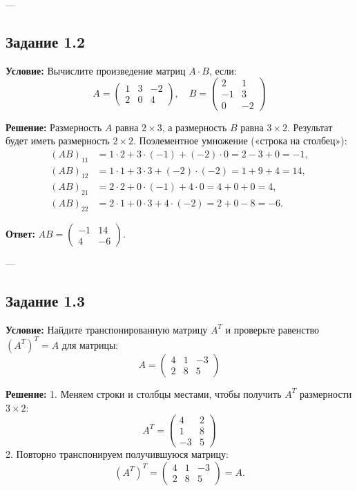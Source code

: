 \documentclass[11pt, a4paper]{article}
\begin{document}
---

\subsection*{Задание 1.2}
\textbf{Условие:} Вычислите произведение матриц $A \cdot B$, если:
$$ A = \begin{pmatrix} 1 & 3 & -2 \\ 2 & 0 & 4 \end{pmatrix}, \quad B = \begin{pmatrix} 2 & 1 \\ -1 & 3 \\ 0 & -2 \end{pmatrix} $$

\textbf{Решение:}
Размерность $A$ равна $2 \times 3$, а размерность $B$ равна $3 \times 2$. Результат будет иметь размерность $2 \times 2$.
Поэлементное умножение («строка на столбец»):
\begin{align*}
(AB)_{11} &= 1 \cdot 2 + 3 \cdot (-1) + (-2) \cdot 0 = 2 - 3 + 0 = -1, \\
(AB)_{12} &= 1 \cdot 1 + 3 \cdot 3 + (-2) \cdot (-2) = 1 + 9 + 4 = 14, \\
(AB)_{21} &= 2 \cdot 2 + 0 \cdot (-1) + 4 \cdot 0 = 4 + 0 + 0 = 4, \\
(AB)_{22} &= 2 \cdot 1 + 0 \cdot 3 + 4 \cdot (-2) = 2 + 0 - 8 = -6.
\end{align*}

\textbf{Ответ:} $AB = \begin{pmatrix} -1 & 14 \\ 4 & -6 \end{pmatrix}$.

---

\subsection*{Задание 1.3}
\textbf{Условие:} Найдите транспонированную матрицу $A^T$ и проверьте равенство $(A^T)^T = A$ для матрицы:
$$ A = \begin{pmatrix} 4 & 1 & -3 \\ 2 & 8 & 5 \end{pmatrix} $$

\textbf{Решение:}
1. Меняем строки и столбцы местами, чтобы получить $A^T$ размерности $3 \times 2$:
$$ A^T = \begin{pmatrix} 4 & 2 \\ 1 & 8 \\ -3 & 5 \end{pmatrix} $$
2. Повторно транспонируем получившуюся матрицу:
$$ (A^T)^T = \begin{pmatrix} 4 & 1 & -3 \\ 2 & 8 & 5 \end{pmatrix} = A. $$
\end{document}
